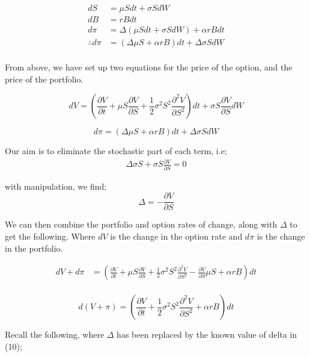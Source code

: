 \documentclass[12pt]{article}
\begin{document}
\begin{align*}
dS &= \mu Sdt + \sigma S dW \\
dB &= rBdt \\
d\pi &= \Delta (\mu Sdt + \sigma SdW) + \alpha rBdt \\
\therefore d \pi &= (\Delta \mu S + \alpha rB)dt + \Delta \sigma SdW \\
\end{align*}

From above, we have set up two equations for the price of the option, and the price of the portfolio.

\begin{equation}
dV = (\frac{\partial V}{\partial t} + \mu S \frac{\partial V}{\partial S} + \frac {1}{2}\sigma ^2 S^2 \frac{\partial ^2 V}{\partial S^2})dt + \sigma S \frac{\partial V}{\partial S}dW
\end{equation}

\begin{equation}
d \pi = (\Delta \mu S + \alpha rB)dt + \Delta \sigma SdW
\end{equation}

Our aim is to eliminate the stochastic part of each term, i.e;
\begin{align*}
\Delta \sigma S + \sigma S \frac{\partial V}{\partial S} = 0
\end{align*}

with manipulation, we find;
\begin{equation}
\Delta = -\frac{\partial V}{\partial S}
\end{equation}

We can then combine the portfolio and option rates of change, along with $\Delta$ to get the following. Where $dV$ is the change in the option rate and $d \pi$ is the change in the portfolio.

\begin{align*}
dV + d \pi &= (\frac{\partial V}{\partial t} + \mu S \frac{\partial V}{\partial S} + \frac{1}{2}\sigma^2 S^2 \frac{\partial ^2 V}{\partial S^2} - \frac{\partial V}{\partial S}\mu S + \alpha rB)dt \\
\end{align*}

\begin{equation}
d(V + \pi) = (\frac{\partial V}{\partial t} + \frac{1}{2}\sigma^2 S^2 \frac{\partial ^2 V}{\partial S^2} + \alpha rB)dt
\end{equation}

Recall the following, where $\Delta$ has been replaced by the known value of delta in (10);
\end{document}
